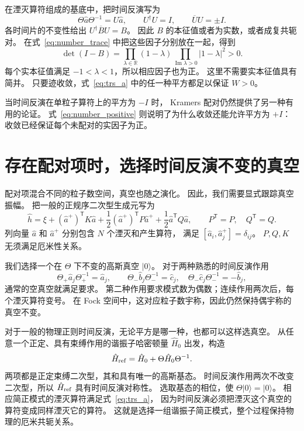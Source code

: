 \documentclass[UTF8,11pt,a4paper,fontset=fandol]{ctexart}
\newcommand{\trans}{\mathsf T}
\numberwithin{equation}{section}
\begin{document}
在湮灭算符组成的基底中，把时间反演写为
\begin{equation}
 \Theta\hat a\Theta^{-1}=U\hat a,
 \qquad U^\dagger U=I,\qquad \overline U U=\pm I.
 \label{eq:trs_a}
\end{equation}
各时间片的不变性给出 $U^\dagger\overline B U=B$。
因此 $B$ 的本征值或者为实数，或者成复共轭对。
在式~\eqref{eq:number_trace} 中把这些因子分别放在一起，得到
\begin{equation}
 \det(I-B)=
 \prod_{\lambda\in\mathbb R}(1-\lambda)
 \prod_{\operatorname{Im}\lambda>0}|1-\lambda|^2>0.
 \label{eq:number_positive}
\end{equation}
每个实本征值满足 $-1<\lambda<1$，所以相应因子也为正。
这里不需要实本征值具有简并。
只要迹收敛，式~\eqref{eq:trs_a} 中的任一种平方都足以保证 $W>0$。

当时间反演在单粒子算符上的平方为 $-I$ 时，
Kramers 配对仍然提供了另一种有用的论证。
式~\eqref{eq:number_positive} 则说明了为什么收敛还能允许平方为 $+I$：
收敛已经保证每个未配对的实因子为正。

\section{存在配对项时，选择时间反演不变的真空}
\label{sec:vacuum}

配对项混合不同的粒子数空间，真空也随之演化。
因此，我们需要显式跟踪真空振幅。
把一般的正规序二次型生成元写为
\begin{equation}
 \hat h=\xi+(\hat a^+)^\trans K\hat a
 +\frac12(\hat a^+)^\trans P\hat a^+
 +\frac12\hat a^\trans Q\hat a,
 \qquad P^\trans=P,\quad Q^\trans=Q.
 \label{eq:normal_generator}
\end{equation}
列向量 $\hat a$ 和 $\hat a^+$ 分别包含 $N$ 个湮灭和产生算符，
满足 $[\hat a_i,\hat a_j^+]=\delta_{ij}$。
$P,Q,K$ 无须满足厄米性关系。

我们选择一个在 $\Theta$ 下不变的高斯真空 $|0\rangle$。
对于两种熟悉的时间反演作用
\begin{equation}
 \Theta_+\hat a_j\Theta_+^{-1}=\hat a_j,
 \qquad
 \Theta_-\hat b_j\Theta_-^{-1}=\hat c_j,
 \quad \Theta_-\hat c_j\Theta_-^{-1}=-\hat b_j,
 \label{eq:two_actions}
\end{equation}
通常的空真空就满足要求。
第二种作用要求模式数为偶数；连续作用两次后，每个湮灭算符变号。
在 Fock 空间中，这对应粒子数宇称，因此仍然保持偶宇称的真空不变。

对于一般的物理正则时间反演，无论平方是哪一种，也都可以这样选真空。
从任意一个正定、具有束缚作用的谐振子哈密顿量 $\hat H_0$ 出发，构造
\begin{equation}
 \hat H_{\rm ref}=\hat H_0+\Theta\hat H_0\Theta^{-1}.
 \label{eq:reference_hamiltonian}
\end{equation}
两项都是正定束缚二次型，其和具有唯一的高斯基态。
时间反演作用两次不改变二次型，所以 $\hat H_{\rm ref}$ 具有时间反演对称性。
选取基态的相位，使 $\Theta|0\rangle=|0\rangle$。
相应简正模式的湮灭算符满足式~\eqref{eq:trs_a}，
因为时间反演必须把湮灭这个真空的算符变成同样湮灭它的算符。
这就是选择一组谐振子简正模式，整个过程保持物理的厄米共轭关系。
\end{document}
